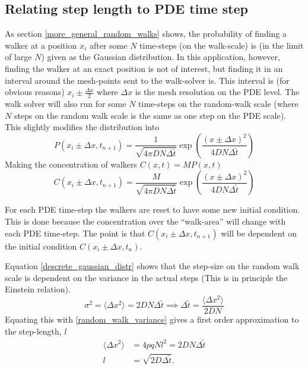 \subsection{Relating step length to PDE time step}\label{probability_distribution_and_timesteps}
As section \ref{more_general_random_walks} shows, the probability of finding a walker at a position $x_i$ after some $N$ time-steps (on the walk-scale) is (in the limit of large $N$) given as the Gaussian distribution. 
In this application, however, finding the walker at an exact position is not of interest, but finding it in an interval around the mesh-points sent to the walk-solver is. 
This interval is (for obvious reasons) $x_i\pm\frac{\Delta x}{2}$ where $\Delta x$ is the mesh resolution on the PDE level. 
The walk solver will also run for some $N$ time-steps on the random-walk scale (where $N$ steps on the random walk scale is the same as one step on the PDE scale). 
This slightly modifies the distribution into
\begin{equation}
 P(x_i\pm\Delta x,t_{n+1}) = \frac{1}{\sqrt{4\pi DN\Delta \tilde{t}}}\exp\left(\frac{(x\pm\Delta x)^2}{4DN\Delta \tilde{t}}\right)
\end{equation}
Making the concentration of walkers $C(x,t) = MP(x,t)$
\begin{equation}
 C(x_i\pm\Delta x,t_{n+1}) = \frac{M}{\sqrt{4\pi DN\Delta \tilde{t}}}\exp\left(\frac{(x\pm\Delta x)^2}{4DN\Delta \tilde{t}}\right)
\end{equation}

For each PDE time-step the walkers are reset to have some new initial condition. 
This is done because the concentration over the ``walk-area'' will change with each PDE time-step.
The point is that $ C(x_i\pm\Delta x,t_{n+1})$ will be dependent on the initial condition $ C(x_i\pm\Delta x,t_{n})$.


Equation \eqref{descrete_gaussian_distr} shows that the step-size on the random walk scale is dependent on the variance in the actual steps (This is in principle the Einstein relation). 
\begin{equation}
 \sigma^2 = \langle\Delta x^2\rangle = 2DN\Delta\tilde{t} \implies \Delta\tilde{t} = \frac{\langle\Delta x^2\rangle}{2DN}
\end{equation}
Equating this with \ref{random_walk_variance} gives a first order approximation to the step-length, $l$
\begin{align}
 \langle\Delta x^2\rangle &= 4pqNl^2 = 2DN\Delta\tilde{t} \nonumber \\ 
 l &= \sqrt{2D\Delta\tilde{t}}. \label{steplength}
\end{align}

